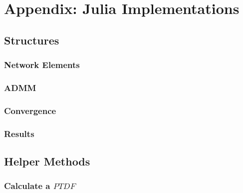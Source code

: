 \appendix				
\section{Appendix: Julia Implementations}

\subsection{Structures}

\subsubsection{Network Elements}
\label{sec:appendix:jl:structures:ne}



\subsubsection{ADMM}
\label{sec:appendix:jl:structures:admm}



\subsubsection{Convergence}
\label{sec:appendix:jl:structures:convergence}



\subsubsection{Results}
\label{sec:appendix:jl:structures:results}



\subsection{Helper Methods}

\subsubsection{Calculate a $PTDF$}
\label{sec:appendix:jl:helpers:ptdf}




